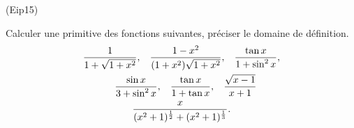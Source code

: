 \begin{tiny}(Eip15)\end{tiny}
Calculer une primitive des fonctions suivantes, pr{\'e}ciser le domaine de d{\'e}finition.
\begin{multline*}
\frac{1}{1+\sqrt{1+x^{2}}},\hspace{0.3cm}
\frac{1-x^{2}}{(1+x^{2})\sqrt{1+x^{2}}},\hspace{0.3cm} 
\frac{\tan x}{1+\sin ^{2}x},\\
\hspace{0.3cm}\frac{\sin x}{3+\sin ^{2}x} ,\hspace{0.3cm}
\frac{\tan x}{1+\tan x},\hspace{0.3cm}
\frac{\sqrt{x-1}}{x+1} \\
\frac{x}{(x^{2}+1)^{\frac{1}{2}}+(x^{2}+1)^{\frac{1}{3}}}.
\end{multline*}